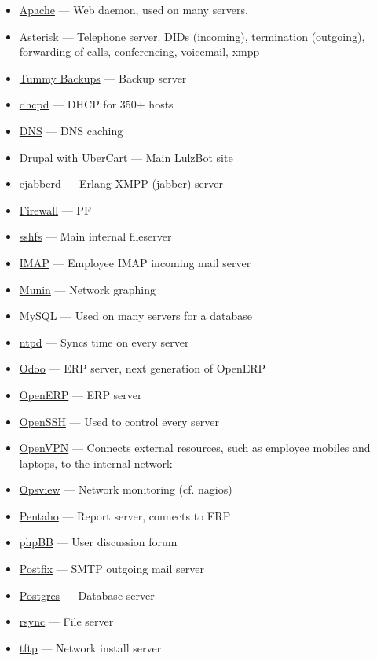 \begin{itemize}
\item \href{http://httpd.apache.org/}{Apache} --- Web daemon, used on many
       servers.
\item \href{http://www.asterisk.org}{Asterisk} --- Telephone server. DIDs
       (incoming), termination (outgoing), forwarding of calls, conferencing,
       voicemail, xmpp
\item \href{https://github.com/tummy-dot-com/tummy-backup}{Tummy Backups} --- Backup server
\item \href{http://dnsmasq.org/}{dhcpd} --- DHCP for 350+ hosts
\item \href{http://dnsmasq.org/}{DNS} --- DNS caching
\item \href{http://www.drupal.org}{Drupal} with
            \href{http://www.ubercart.org/}{UberCart} --- Main LulzBot site
\item \href{http://www.ejabberd.im/}{ejabberd} --- Erlang XMPP (jabber) server
\item \href{http://www.openbsd.org/faq/pf/}{Firewall} --- PF
\item \href{http://fuse.sourceforge.net/sshfs.html}{sshfs} --- Main internal fileserver
\item \href{http://dovecot.org/}{IMAP} --- Employee IMAP incoming mail server
\item \href{http://munin-monitoring.org/}{Munin} --- Network graphing
\item \href{http://www.mysql.org/}{MySQL} --- Used on many servers for a database
\item \href{http://support.ntp.org/}{ntpd} --- Syncs time on every server
\item \href{http://www.odoo.com/}{Odoo} --- ERP server, next generation of OpenERP
\item \href{http://www.openerp.org/}{OpenERP} --- ERP server
\item \href{http://www.openssh.com/}{OpenSSH} --- Used to control every server
\item \href{http://openvpn.net/}{OpenVPN} --- Connects external resources,
       such as employee mobiles and laptops, to the internal network
\item \href{http://www.opsview.com/}{Opsview} --- Network monitoring (cf.
       nagios)
\item \href{http://community.pentaho.com/}{Pentaho} --- Report server,
       connects to ERP
\item \href{https://www.phpbb.com/}{phpBB} --- User discussion forum
\item \href{http://www.postfix.org/}{Postfix} --- SMTP outgoing mail server
\item \href{http://www.postgresql.org/}{Postgres} --- Database server
\item \href{http://rsync.samba.org/}{rsync} --- File server
\item \href{http://dnsmasq.org/}{tftp} --- Network install server
\end{itemize}

